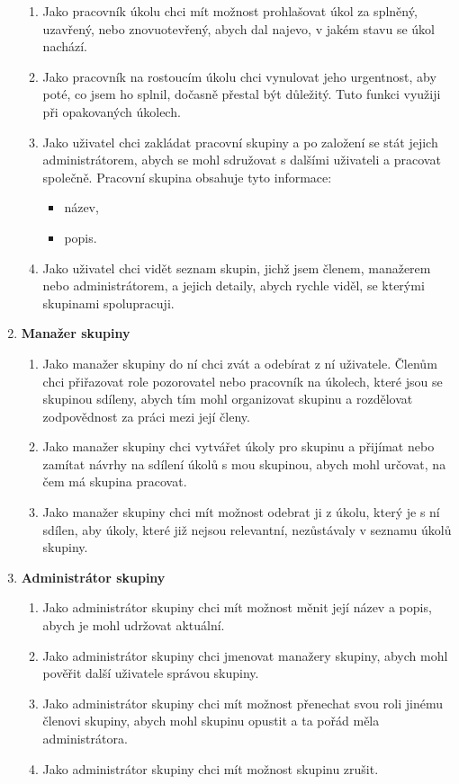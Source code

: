 \documentclass[thesis=B,czech]{FITthesis}[2012/06/26]
\begin{document}
\begin{enumerate}
\begin{enumerate}
				\item Jako pracovník úkolu chci mít možnost prohlašovat úkol za splněný, uzavřený, nebo znovuotevřený, abych dal najevo, v jakém stavu se úkol nachází.
				
				\item Jako pracovník na rostoucím úkolu chci vynulovat jeho urgentnost, aby poté, co jsem ho splnil, dočasně přestal být důležitý. Tuto funkci využiji při opakovaných úkolech.
				
				\item Jako uživatel chci zakládat pracovní skupiny a po založení se stát jejich administrátorem, abych se mohl sdružovat s dalšími uživateli a pracovat společně. Pracovní skupina obsahuje tyto informace:
				\begin{itemize}
					\item název,
					\item popis.
				\end{itemize}
				
				\item Jako uživatel chci vidět seznam skupin, jichž jsem členem, manažerem nebo administrátorem, a jejich detaily, abych rychle viděl, se kterými skupinami spolupracuji.
			\end{enumerate}
			
			
			\item \textbf{Manažer skupiny}
			\begin{enumerate}
				\item Jako manažer skupiny do ní chci zvát a odebírat z ní uživatele. Členům chci přiřazovat role pozorovatel nebo pracovník na úkolech, které jsou se skupinou sdíleny, abych tím mohl organizovat skupinu a rozdělovat zodpovědnost za práci mezi její členy. 
				
				\item Jako manažer skupiny chci vytvářet úkoly pro skupinu a přijímat nebo zamítat návrhy na sdílení úkolů s mou skupinou, abych mohl určovat, na čem má skupina pracovat.
				
				\item Jako manažer skupiny chci mít možnost odebrat ji z úkolu, který je s ní sdílen, aby úkoly, které již nejsou relevantní, nezůstávaly v seznamu úkolů skupiny.
			\end{enumerate}
			
			
			\item \textbf{Administrátor skupiny}
			\begin{enumerate}
				\item Jako administrátor skupiny chci mít možnost měnit její název a popis, abych je mohl udržovat aktuální.
				\item Jako administrátor skupiny chci jmenovat manažery skupiny, abych mohl pověřit další uživatele správou skupiny.
				\item Jako administrátor skupiny chci mít možnost přenechat svou roli jinému členovi skupiny, abych mohl skupinu opustit a ta pořád měla administrátora.
				\item Jako administrátor skupiny chci mít možnost skupinu zrušit.
			\end{enumerate}
		\end{enumerate}	
		
\end{document}
